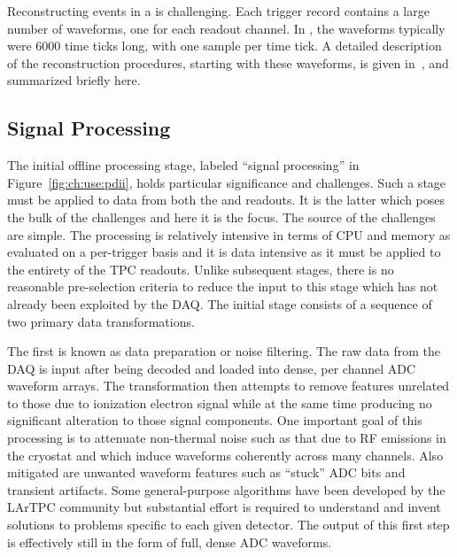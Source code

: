 \documentclass[../main-v1.tex]{subfiles}
\begin{document}
Reconstructing events in a  is challenging.  Each trigger record contains a large number of waveforms, one for each readout channel.  In , the waveforms typically were 6000 time ticks long, with one  sample per time tick.  A detailed description of the reconstruction procedures, starting with these waveforms, is given in~\cite{Abi:2020mwi}, and summarized briefly here.

\subsection{Signal Processing }

The initial offline processing stage, labeled ``signal processing'' in Figure~\ref{fig:ch:use:pdii}, holds particular significance and challenges.
Such a stage must be applied to data from both the  and  readouts.
It is the latter which poses the bulk of the challenges and here it is the focus.
The source of the challenges are simple.
The processing is relatively intensive in terms of CPU and memory as evaluated on a per-trigger basis and it is data intensive as it must be applied to the entirety of the TPC readouts.
Unlike subsequent stages, there is no reasonable pre-selection criteria to reduce the input to this stage which has not already been exploited by the DAQ.
The initial stage consists of a sequence of two primary data transformations.

The first is known as data preparation or noise filtering.
The raw data from the DAQ is input after being decoded and loaded into dense, per channel ADC waveform arrays.
The transformation then attempts to remove features unrelated to those due to ionization electron signal while at the same time producing no significant alteration to those signal components.
One important goal of this processing is to attenuate non-thermal noise such as that due to RF emissions in the cryostat and which induce waveforms coherently across many channels.
Also mitigated are unwanted waveform features such as ``stuck'' ADC bits and transient artifacts.
Some general-purpose algorithms have been developed by the LArTPC community but substantial effort is required to understand and invent solutions to problems specific to each given detector. 
The output of this first step is effectively still in the form of full, dense ADC waveforms.
\end{document}
